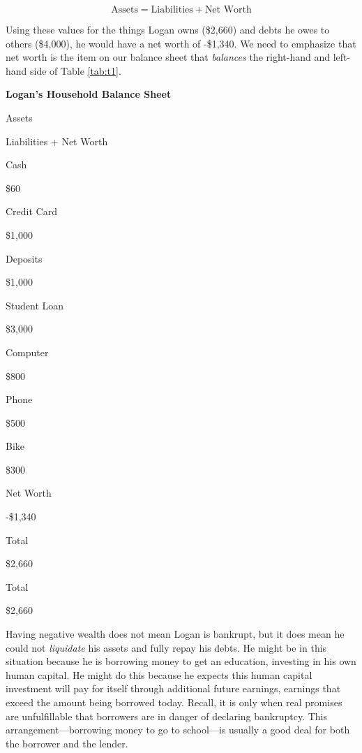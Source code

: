 \documentclass[
]{book}
\begin{document}
\[ \text{Assets}=\text{Liabilities}+\text{Net Worth}\]

Using these values for the things Logan owns (\$2,660) and debts he owes to others (\$4,000), he would have a net worth of -\$1,340. We need to emphasize that net worth is the item on our balance sheet that \emph{balances} the right-hand and left-hand side of Table \ref{tab:t1}.

\label{tab:t1}\textbf{Logan's Household Balance Sheet}

Assets

Liabilities + Net Worth

Cash

\$60

Credit Card

\$1,000

Deposits

\$1,000

Student Loan

\$3,000

Computer

\$800

Phone

\$500

Bike

\$300

Net Worth

-\$1,340

Total

\$2,660

Total

\$2,660

Having negative wealth does not mean Logan is bankrupt, but it does mean he could not \emph{liquidate} his assets and fully repay his debts. He might be in this situation because he is borrowing money to get an education, investing in his own human capital. He might do this because he expects this human capital investment will pay for itself through additional future earnings, earnings that exceed the amount being borrowed today. Recall, it is only when real promises are unfulfillable that borrowers are in danger of declaring bankruptcy. This arrangement---borrowing money to go to school---is usually a good deal for both the borrower and the lender.
\end{document}
